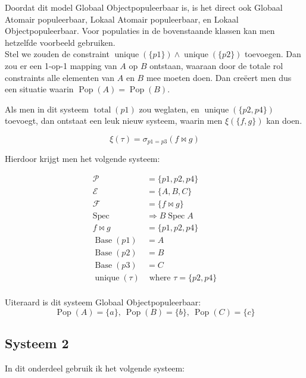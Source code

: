 \documentclass[10pt]{article}
\newcommand{\Spec}{\ensuremath{\operatorname{Spec}}}
\newcommand{\Base}{\ensuremath{\operatorname{Base}}}
\newcommand{\total}{\ensuremath{\operatorname{total}}}
\newcommand{\unique}{\ensuremath{\operatorname{unique}}}
\newcommand{\Pop}{\ensuremath{\operatorname{Pop}}}
\begin{document}
Doordat dit model Globaal Objectpopuleerbaar is, is het direct ook Globaal
Atomair populeerbaar, Lokaal Atomair populeerbaar, en Lokaal
Objectpopuleerbaar. Voor populaties in de bovenstaande klassen kan men
hetzelfde voorbeeld gebruiken.\\


Stel we zouden de constraint $\operatorname{unique}(\{p1\}) \wedge
\operatorname{unique}(\{p2\})$ toevoegen. Dan zou er een 1-op-1 mapping van $A$
op $B$ ontstaan, waaraan door de totale rol constraints alle elementen van $A$
en $B$ mee moeten doen. Dan creëert men dus een situatie waarin
$\operatorname{Pop}(A)=\operatorname{Pop}(B)$.

Als men in dit systeem $\total (p1)$ zou weglaten, en $\operatorname{unique}
(\{p2,p4\})$ toevoegt, dan ontstaat een leuk nieuw systeem, waarin men $\xi
(\{f,g\})$ kan doen. 

\[
  \xi (\tau) = \sigma_{p1=p3} (f \bowtie g)
\]

Hierdoor krijgt men het volgende systeem:

\begin{align*}
  \mathcal{P} & = \{p1,p2,p4\}    \\
  \mathcal{E} & = \{A,B,C\}       \\
  \mathcal{F} & =  \{f\bowtie g\} \\
  \Spec &\Rightarrow B \Spec A    \\
  f \bowtie g & = \{p1,p2,p4\}    \\
  \Base (p1)  & = A               \\
  \Base (p2)  & = B               \\
  \Base (p3)  & = C               \\
  \unique (\tau) &\text{ where } \tau = \{p2,p4\} \\
\end{align*}

Uiteraard is dit systeem Globaal Objectpopuleerbaar: 
\[ \Pop (A) = \{a\},\  \Pop (B) = \{b\},\  \Pop (C)= \{c\} \]

\subsection{Systeem 2}

In dit onderdeel gebruik ik het volgende systeem: 
\end{document}
